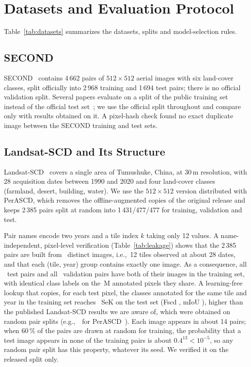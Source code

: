 \documentclass[journal]{IEEEtran}
\begin{document}
\section{Datasets and Evaluation Protocol}
\label{sec:protocol}
Table~\ref{tab:datasets} summarizes the datasets, splits and model-selection rules.



\subsection{SECOND}
SECOND~\cite{yang2022asymmetric} contains 4\,662 pairs of $512\times512$ aerial images with six
land-cover classes, split officially into 2\,968 training and 1\,694 test pairs; there is no
official validation split. Several papers evaluate on a split of the public training set
instead of the official test set~\cite{ding2022bi,ding2024joint}; we use the official split
throughout and compare only with results obtained on it. A pixel-hash check found no exact
duplicate image between the SECOND training and test sets.

\subsection{Landsat-SCD and Its Structure}
\label{sec:landsat-data}
Landsat-SCD~\cite{yuan2022transformer} covers a single area of Tumushuke, China, at 30\,m
resolution, with 28 acquisition dates between 1990 and 2020 and four land-cover classes
(farmland, desert, building, water). We use the $512\times512$ version distributed with
PerASCD, which removes the offline-augmented copies of the original release and keeps 2\,385
pairs split at random into 1\,431/477/477 for training, validation and test.

Pair names encode two years and a tile index $k$ taking only 12 values. A name-independent,
pixel-level verification (Table~\ref{tab:leakage}) shows that the 2\,385 pairs are built from
\LkDistinct\ distinct images, i.e.,\ 12 tiles observed at about 28 dates, and that each
(tile, year) group contains exactly one image. As a consequence, all \LkTest\ test pairs and
all \LkVal\ validation pairs have both of their images in the training set, with identical
class labels on the \LkPixels\,M annotated pixels they share. A learning-free lookup that
copies, for each test pixel, the classes annotated for the same tile and year in the training
set reaches \LkOracleSek\ SeK on the test set (Fscd \LkOracleFscd, mIoU \LkOracleMiou), higher
than the published Landsat-SCD results we are aware of, which were obtained on random pair splits
(e.g.,\ \PerascdLandsat\ for PerASCD~\cite{shen2026foundation}). Each image appears in about 14
pairs; when 60\,\% of the pairs are drawn at random for training, the probability that a test image
appears in none of the training pairs is about $0.4^{13}<10^{-5}$, so any random pair split has
this property, whatever its seed. We verified it on the released split only.
\end{document}
